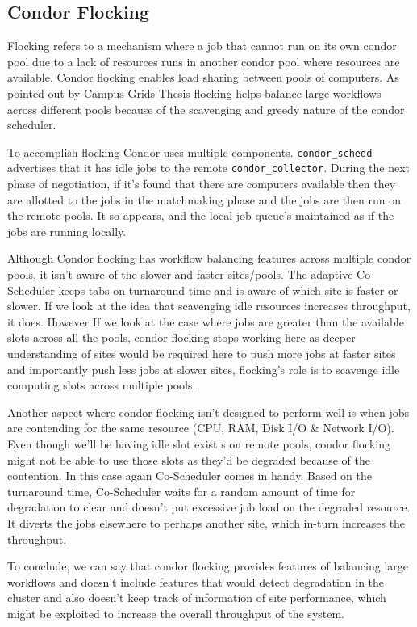 \documentclass[ms,electronic,double]{nuthesis}
\begin{document}
\subsection{Condor Flocking}
Flocking refers to a mechanism where a job that cannot run on its own condor pool 
due to a lack of resources runs in another condor pool where resources are 
available. Condor flocking enables load sharing between pools of computers. As 
pointed out by Campus Grids Thesis\cite{derekThesis} flocking helps balance large workflows across different pools because of the scavenging and greedy nature 
of the condor scheduler.

To accomplish flocking Condor uses multiple components. 
\texttt{condor\_schedd} advertises that it has idle jobs to the remote \texttt{condor\_collector}. During the next phase of negotiation, if it's found that there are computers 
available then they are allotted to the jobs in the matchmaking phase and the 
jobs are then run on the remote pools. It so appears, and the local job queue's maintained as if 
the jobs are running locally. 

Although Condor flocking has workflow balancing features across multiple condor 
pools, it isn't aware of the slower and faster sites/pools. The adaptive Co-Scheduler 
keeps tabs on turnaround time and is aware of which site is faster or slower. If we 
look at the idea that scavenging idle resources increases throughput, it does. However If we look at the case where jobs are greater than the available slots 
across all the pools, condor flocking stops working here as deeper understanding of sites
would be required here to push more jobs at faster sites and importantly push less jobs
at slower sites, flocking's role is to scavenge idle computing slots across multiple pools. 

Another aspect where condor flocking isn't designed to perform well is when jobs are 
contending for the same resource (CPU, RAM, Disk I/O \& Network I/O). Even though we'll be 
having idle slot exist s on remote pools, condor flocking might not be able to use those 
slots as they'd be degraded because of the contention. In this case again 
Co-Scheduler comes in handy. Based on the turnaround time, Co-Scheduler waits for a random 
amount of time for degradation to clear and doesn't put excessive job load on the 
degraded resource. It diverts the jobs elsewhere to perhaps another site, which in-turn increases the 
throughput.

To conclude, we can say that condor flocking provides features of balancing 
large workflows and doesn't include features that would detect degradation in 
the cluster and also doesn't keep track of information of site performance, which might be exploited to increase the overall throughput of the system. 
\end{document}
